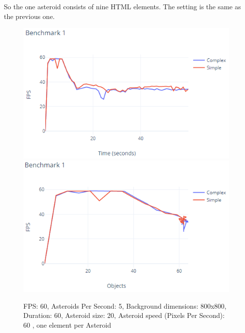 So the one asteroid consists of nine HTML elements.
The setting is the same as the previous one.
\par
\begin{figure}\centering
\includegraphics{./img/graph_1}
\includegraphics{./img/graph_2}
\caption{FPS: 60, Asteroids Per Second: 5, Background dimensions: 800x800, Duration: 60, Asteroid size: 20, Asteroid speed (Pixels Per Second): 60 , one element per Asteroid}
\label{img31:benchmark1}
\end{figure} 
\par
